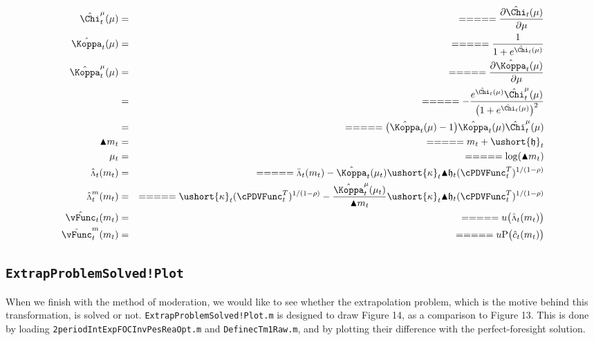 \documentclass[titlepage,abstract]{\econtex}
\providecommand{\vInv}{\ensuremath{\scriptstyle \Lambda \displaystyle}}
\begin{document}
\begin{itemize}
            \begin{equation}\begin{gathered}\begin{aligned}
            \hat{\Chi}^{\mu}_{t}(\mu)      &=& =  =  =  =  =  \frac{\partial \hat{\Chi}_{t}(\mu)}{\partial \mu} \\
            \hat{\Koppa}_{t} (\mu)      &=& =  =  =  =  =  \frac{1}{1+e^{\hat{\Chi}_{t}(\mu)}} \\
            \hat{\Koppa}^{\mu}_{t} (\mu)      &=& =  =  =  =  =  \frac{\partial \hat{\Koppa}_{t} (\mu)}{\partial \mu} \\
                 &=& =  =  =  =  =  -\frac{e^{\hat{\Chi}_{t}(\mu)} \hat{\Chi}^{\mu}_{t}(\mu)}{\big(1+e^{\hat{\Chi}_{t}(\mu)}\big)^{2}} \\
                 &=& =  =  =  =  =  \big(\hat{\Koppa}_{t} (\mu)-1\big)\hat{\Koppa}_{t} (\mu) \hat{\Chi}^{\mu}_{t}(\mu) \\
            \blacktriangle m_{t}      &=& =  =  =  =  =  m_{t} + \ushort{\mathfrak{h}}_{t} \\
            \mu_{t}      &=& =  =  =  =  =  \log(\blacktriangle m_{t}) \\
            \hat{\vInv}_{t} (m_{t})      &=& =  =  =  =  =  \bar{\vInv}_{t}(m_{t})-\hat{\Koppa}_{t} (\mu_{t}) \ushort{\kappa}_{t} \blacktriangle \mathfrak{h}_{t} (\cPDVFunc_{t}^{T})^{1/(1-\rho)} \\
            \hat{\vInv}_{t}^{m} (m_{t})      &=& =  =  =  =  =  \ushort{\kappa}_{t} (\cPDVFunc_{t}^{T})^{1/(1-\rho)}-\frac{\hat{\Koppa}_{t}^{\mu}(\mu_{t})}{\blacktriangle m_{t}} \ushort{\kappa}_{t} \blacktriangle \mathfrak{h}_{t} (\cPDVFunc_{t}^{T})^{1/(1-\rho)} \\
            \hat{\vFunc}_{t} (m_{t})      &=& =  =  =  =  =  u\big(\hat{\vInv}_{t}(m_{t})\big) \\
            \hat{\vFunc}_{t}^{m} (m_{t})      &=& =  =  =  =  =  u\text{P}\big(\hat{c}_{t}(m_{t})\big)
            \end{aligned}\end{gathered}\end{equation}
\end{itemize}

\subsection{\texttt{ExtrapProblemSolved!Plot}}

When we finish with the method of moderation, we would like to see whether the extrapolation problem, which is the motive behind this transformation, is solved or not. \texttt{ExtrapProblemSolved!Plot.m} is designed to draw Figure 14, as a comparison to Figure 13. This is done by loading \texttt{2periodIntExpFOCInvPesReaOpt.m} and \texttt{DefinecTm1Raw.m}, and by plotting their difference with the perfect-foresight solution.
\end{document}
